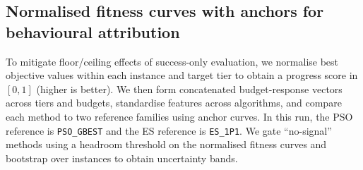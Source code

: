 \subsection{Normalised fitness curves with anchors for behavioural attribution}
To mitigate floor/ceiling effects of success-only evaluation, we normalise best objective values within each instance and target tier to obtain a progress score in $[0,1]$ (higher is better). We then form concatenated budget-response vectors across tiers and budgets, standardise features across algorithms, and compare each method to two reference families using anchor curves. In this run, the PSO reference is \texttt{PSO_GBEST} and the ES reference is \texttt{ES_1P1}. We gate ``no-signal'' methods using a headroom threshold on the normalised fitness curves and bootstrap over instances to obtain uncertainty bands.
